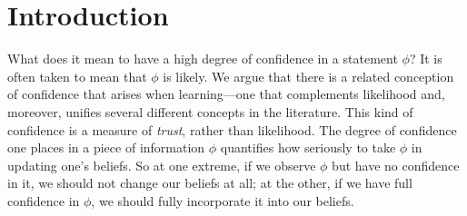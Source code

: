 

\section{Introduction}
\def\stmt{$A$}



What does it mean to have a high degree of confidence in a statement $\phi$? 
It is often taken to mean that $\phi$ is likely.
We argue that there is a related conception of confidence that arises when learning---one that complements likelihood and, moreover, unifies several different concepts in the literature.
This kind of confidence is a measure of \emph{trust}, rather than likelihood.
The degree of confidence one places in a piece of information $\phi$
quantifies how seriously to take $\phi$ in updating one's beliefs.
So at one extreme,
if we observe $\phi$ but have no confidence in it,
we should not change our beliefs at all;
at the other, if we have full confidence in $\phi$,
 we should fully incorporate it into our beliefs.

